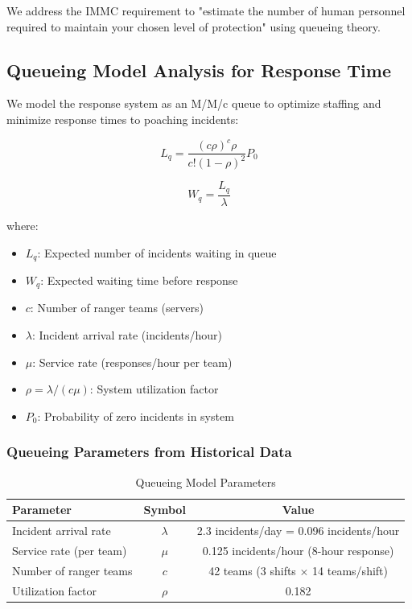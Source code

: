 We address the IMMC requirement to "estimate the number of human personnel required to maintain your chosen level of protection" using queueing theory.

\subsection{Queueing Model Analysis for Response Time}

We model the response system as an M/M/c queue to optimize staffing and minimize response times to poaching incidents:

\begin{equation}
L_q = \frac{(c\rho)^c \rho}{c!(1-\rho)^2} P_0
\label{eq:queue_length}
\end{equation}

\begin{equation}
W_q = \frac{L_q}{\lambda}
\label{eq:waiting_time}
\end{equation}

where:
\begin{itemize}
    \item $L_q$: Expected number of incidents waiting in queue
    \item $W_q$: Expected waiting time before response
    \item $c$: Number of ranger teams (servers)
    \item $\lambda$: Incident arrival rate (incidents/hour)
    \item $\mu$: Service rate (responses/hour per team)
    \item $\rho = \lambda/(c\mu)$: System utilization factor
    \item $P_0$: Probability of zero incidents in system
\end{itemize}

\subsubsection{Queueing Parameters from Historical Data}

\begin{table}[h]
\centering
\caption{Queueing Model Parameters}
\begin{tabular}{lcc}
\hline
\textbf{Parameter} & \textbf{Symbol} & \textbf{Value} \\
\hline
Incident arrival rate & $\lambda$ & 2.3 incidents/day = 0.096 incidents/hour \\
Service rate (per team) & $\mu$ & 0.125 incidents/hour (8-hour response) \\
Number of ranger teams & $c$ & 42 teams (3 shifts $\times$ 14 teams/shift) \\
Utilization factor & $\rho$ & 0.182 \\
\hline
\end{tabular}
\end{table}

